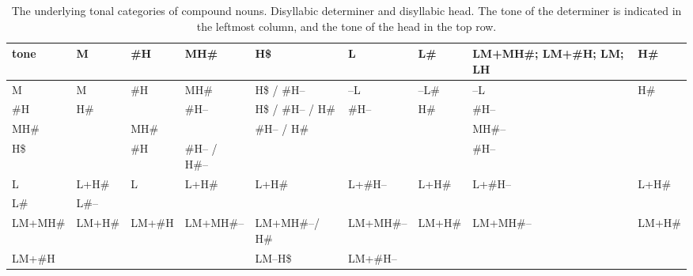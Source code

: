 \begin{subtables}
\begin{table}
\caption{\label{tab:abstractdisyllabicdisyllables}The underlying tonal categories of compound nouns. Disyllabic determiner and disyllabic head. The tone of the determiner is indicated in the leftmost column, and the tone of the head in the top row.}
{\renewcommand{\arraystretch}{1.65}
{\fontsize{10}{10.75}\selectfont
\begin{tabularx}{\textwidth}{ l@{\hspace{16pt}} P{12mm} P{12mm} P{16mm} P{22mm} P{20mm} P{12mm} Q P{12mm} }
  \lsptoprule tone & M & \#H & MH\# & H\$ & L & L\# & LM+MH\#;\hack{\par} LM+\#H;\hack{\par} LM; LH & H\#\\\midrule
  M & M & \#H & MH\# & H\$ / \#H-- & --L & --L\# & --L & H\#\\
  \#H & H\# & \hspace*{\fill} & \#H-- & H\$ / \#H-- / H\# & \#H-- & H\# & \#H-- &\\
  MH\# &  & MH\# & \hspace*{\fill} & \#H-- / H\# &  &  & MH\#-- &\\
  H\$ & \hspace*{\fill} & \#H & \#H-- / H\#-- & \hspace*{\fill} & \hspace*{\fill} & \hspace*{\fill} & \#H-- &  \hspace*{\fill}\\
  L & L+H\# & L & L+H\# & L+H\# & L+\#H-- & L+H\# & L+\#H-- & L+H\#\\
  L\# & L\#-- &  &  &  &  &  &  & \hspace*{\fill}\\
  LM+MH\# & LM+H\# & LM+\#H & LM+MH\#-- & LM+MH\#--/ H\# & LM+MH\#-- & LM+H\# & LM+MH\#-- & LM+H\#\\
  LM+\#H & \hspace*{\fill} &  & \hspace*{\fill} & LM--H\$ & LM+\#H-- & \hspace*{\fill} & \hspace*{\fill} &\\

\end{tabularx}}}
\end{table}
\end{subtables}

